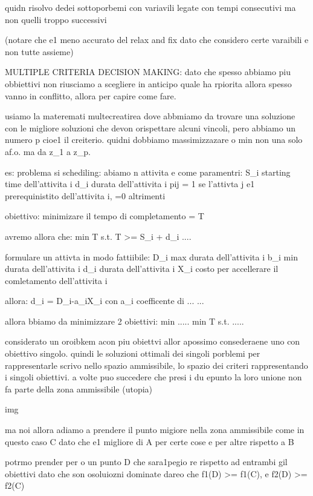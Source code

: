 quidn risolvo dedei sottoporbemi con variavili legate con tempi consecutivi ma non quelli troppo successivi

(notare che e1 meno accurato del relax and fix dato che considero certe varaibili e non tutte assieme)





MULTIPLE CRITERIA DECISION MAKING:
dato che spesso abbiamo piu obbiettivi non riusciamo a scegliere in anticipo quale ha rpiorita allora spesso vanno in conflitto, allora per capire come fare. 

usiamo la materemati multecreatirea dove abbmiamo da trovare una soluzione con le migliore soluzioni che devon orispettare alcuni vincoli, pero abbiamo un numero p cioe1 il creiterio. quidni dobbiamo massimizzazare o min non una solo af.o. ma da z_1 a z_p.

es: problema si schediling:
abiamo n attivita e come paramentri:
S_i starting time dell'attivita i
d_i durata dell'attivita i
pij = 1 se l'attivta j e1 prerequinistito dell'attivita i, =0 altrimenti

obiettivo: minimizare il tempo di completamento = T


avremo allora che:
min T
s.t.
T >= S_i + d_i ....



formulare un attivta in modo fattiibile:
D_i max durata dell'attivita i
b_i min durata dell'attivita i
d_i durata dell'attivita i
X_i costo per accellerare il comletamento dell'attivita i

allora:
d_i = D_i-a_iX_i con a_i coefficente di ...
...

allora bbiamo da minimizzare 2 obiettivi:
min \sum .....
min T
s.t.
.....


considerato un oroibkem acon piu obiettvi allor apossimo consederaene uno con obiettivo singolo. quindi le soluzioni ottimali dei singoli porblemi per rappresentarle scrivo nello spazio ammissibile, lo spazio dei criteri rappresentando i singoli obiettivi. a volte puo succedere che presi i du epunto la loro unione non fa parte della zona ammissibile (utopia)

img

ma noi allora adiamo a prendere il punto migiore nella zona ammissibile come in questo caso C dato che e1 migliore di A per certe cose e per altre rispetto a B

potrmo prender per o un punto D che sara1pegio re rispetto ad entrambi gil obiettivi dato che son osoluiozni dominate dareo che f1(D) >= f1(C), e f2(D) >= f2(C)

